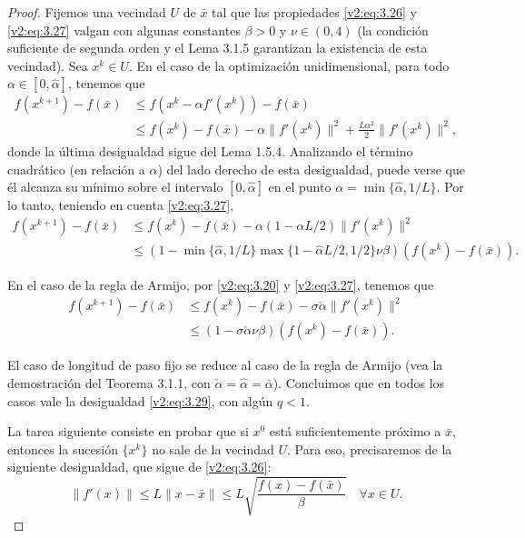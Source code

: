 \begin{proof}
    Fijemos una vecindad $U$ de $\bar{x}$ tal que las propiedades \eqref{v2:eq:3.26} y \eqref{v2:eq:3.27} valgan con algunas constantes $\beta > 0$ y $\nu \in (0, 4)$ (la condición suficiente de segunda orden y el Lema 3.1.5 garantizan la existencia de esta vecindad).
    Sea $x^k \in U$. En el caso de la optimización unidimensional, para todo $\alpha \in [0, \hat{\alpha}]$, tenemos que
    \begin{align*}
        f(x^{k+1}) - f(\bar{x}) &\le f(x^k - \alpha f'(x^k)) - f(\bar{x}) \\
        &\le f(x^k) - f(\bar{x}) - \alpha\|f'(x^k)\|^2 + \frac{L\alpha^2}{2}\|f'(x^k)\|^2,
    \end{align*}
    donde la última desigualdad sigue del Lema 1.5.4. Analizando el término cuadrático (en relación a $\alpha$) del lado derecho de esta desigualdad, puede verse que él alcanza su mínimo sobre el intervalo $[0, \hat{\alpha}]$ en el punto $\alpha = \min\{\hat{\alpha}, 1/L\}$. Por lo tanto, teniendo en cuenta \eqref{v2:eq:3.27},
    \begin{align}
        f(x^{k+1}) - f(\bar{x}) &\le f(x^k) - f(\bar{x}) - \alpha(1 - \alpha L/2)\|f'(x^k)\|^2 \nonumber \\
        &\le (1 - \min\{\hat{\alpha}, 1/L\}\max\{1 - \hat{\alpha} L/2, 1/2\}\nu\beta)(f(x^k) - f(\bar{x})).
        \label{v2:eq:3.37}
    \end{align}

    En el caso de la regla de Armijo, por \eqref{v2:eq:3.20} y \eqref{v2:eq:3.27}, tenemos que
    \begin{align}
        f(x^{k+1}) - f(\bar{x}) &\le f(x^k) - f(\bar{x}) - \sigma\check{\alpha}\|f'(x^k)\|^2 \nonumber \\
        &\le (1 - \sigma\check{\alpha}\nu\beta)(f(x^k) - f(\bar{x})).
        \label{v2:eq:3.38}
    \end{align}

    El caso de longitud de paso fijo se reduce al caso de la regla de Armijo (vea la demostración del Teorema 3.1.1, con $\check{\alpha} = \hat{\alpha} = \bar{\alpha}$).
    Concluimos que en todos los casos vale la desigualdad \eqref{v2:eq:3.29}, con algún $q < 1$.

    La tarea siguiente consiste en probar que si $x^0$ está suficientemente próximo a $\bar{x}$, entonces la sucesión $\{x^k\}$ no sale de la vecindad $U$. Para eso, precisaremos de la siguiente desigualdad, que sigue de \eqref{v2:eq:3.26}:
    \begin{equation}
        \|f'(x)\| \le L\|x - \bar{x}\| \le L\sqrt{\frac{f(x) - f(\bar{x})}{\beta}} \quad \forall x \in U.
        \label{v2:eq:3.39}
    \end{equation}


\end{proof}
